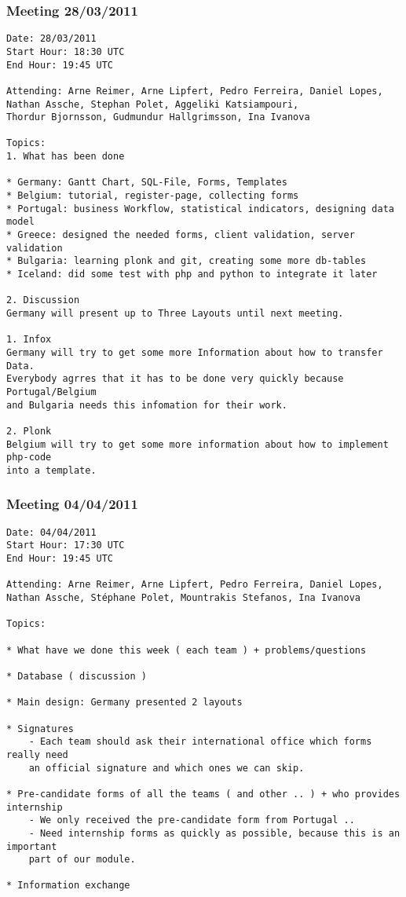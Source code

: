 \subsubsection{Meeting 28/03/2011}
\normalsize
\begin{verbatim}
Date: 28/03/2011
Start Hour: 18:30 UTC
End Hour: 19:45 UTC

Attending: Arne Reimer, Arne Lipfert, Pedro Ferreira, Daniel Lopes,
Nathan Assche, Stephan Polet, Aggeliki Katsiampouri,
Thordur Bjornsson, Gudmundur Hallgrimsson, Ina Ivanova

Topics:
1. What has been done

* Germany: Gantt Chart, SQL-File, Forms, Templates
* Belgium: tutorial, register-page, collecting forms
* Portugal: business Workflow, statistical indicators, designing data model
* Greece: designed the needed forms, client validation, server validation
* Bulgaria: learning plonk and git, creating some more db-tables
* Iceland: did some test with php and python to integrate it later

2. Discussion
Germany will present up to Three Layouts until next meeting.

1. Infox
Germany will try to get some more Information about how to transfer Data.
Everybody agrres that it has to be done very quickly because Portugal/Belgium
and Bulgaria needs this infomation for their work.

2. Plonk
Belgium will try to get some more information about how to implement php-code
into a template.
\end{verbatim}

\vspace{50px}
\subsubsection{Meeting 04/04/2011}
\normalsize
\begin{verbatim}
Date: 04/04/2011
Start Hour: 17:30 UTC
End Hour: 19:45 UTC

Attending: Arne Reimer, Arne Lipfert, Pedro Ferreira, Daniel Lopes,
Nathan Assche, Stéphane Polet, Mountrakis Stefanos, Ina Ivanova

Topics:

* What have we done this week ( each team ) + problems/questions
	
* Database ( discussion )

* Main design: Germany presented 2 layouts

* Signatures 
	- Each team should ask their international office which forms really need 
	an official signature and which ones we can skip.

* Pre-candidate forms of all the teams ( and other .. ) + who provides
internship
    - We only received the pre-candidate form from Portugal ..
	- Need internship forms as quickly as possible, because this is an important
	part of our module.

* Information exchange
\end{verbatim}


